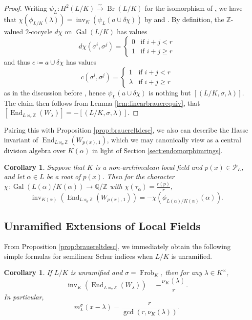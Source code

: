 \documentclass[10pt, reqno, hidelinks]{amsart}
\DeclareMathOperator{\Gal}{Gal}
\DeclareMathOperator{\Br}{Br}
\DeclareMathOperator{\End}{End}
\DeclareMathOperator{\inv}{inv}
\DeclareMathOperator{\Frob}{Frob}
\newcommand{\twopartdef}[4]
{
	\left\{
		\begin{array}{ll}
			#1 & \mbox{if } #2 \\
			#3 & \mbox{if } #4
		\end{array}
	\right.
}
\newcommand{\bQ}{{\mathbb Q}}
\newcommand{\bZ}{{\mathbb Z}}
\newcommand{\sP}{{\mathcal P}}
\numberwithin{thm}{subsection}
\newtheorem{cor}[thm]{Corollary}
\theoremstyle{definition}
\begin{document}
\begin{proof}
	Writing $\psi_L \colon H^2(L/K) \xrightarrow{\sim} \Br(L/K)$ for the isomorphism of \cite[Thm.\ IV. 3.14]{milneCFT}, we have that $\chi(\phi_{L/K}(\lambda)) = \inv_K(\psi_L(a \cup \delta \chi))$ by \cite[Prop.\ III.3.6 ]{milneCFT} and \cite[Rem.\ IV.4.4(a)]{milneCFT}. By definition, the $\bZ$-valued $2$-cocycle $d\chi$ on $\Gal(L/K)$ has values
	\[
	d\chi(\sigma^i, \sigma^j) = \twopartdef{0}{i+j < r}{1}{i+j \geq r}
	\]
	and thus $c \coloneqq a \cup \delta \chi$ has values
	\[
	c(\sigma^i, \sigma^j) = \twopartdef{1}{i+j < r}{\lambda}{i+j \geq r}
	\]
	as in the discussion before \cite[Prop.\ III.3.6 ]{milneCFT}, hence $\psi_L(a \cup \delta \chi)$ is nothing but $[(L/K, \sigma, \lambda)]$. The claim then follows from Lemma \ref{lem:linearbrauerequiv}, that $[\End_{L \rtimes_{\sigma} \bZ}(W_{\lambda})] = -[(L/K, \sigma, \lambda)]$. 
\end{proof}

Pairing this with Proposition \ref{prop:brauereltdesc}, we also can describe the Hasse invariant of $\End_{L \rtimes_{\sigma} \bZ}(W_{p(x),1})$, which we may canonically view as a central division algebra over $K(\alpha)$ in light of Section \ref{sect:endomorphimrings}.

\begin{cor}
Suppose that $K$ is a non-archimedean local field and $p(x) \in \sP_L$, and let $\alpha \in \overline{L}$ be a root of $p(x)$. Then for the character $\chi \colon \Gal(L(\alpha) / K(\alpha)) \rightarrow \bQ / \bZ$ with $\chi(\tau_{\alpha}) = \frac{r(p)}{r}$, 
\[
\inv_{K(\alpha)}(\End_{L \rtimes_{\sigma} \bZ}(W_{p(x),1})) = -\chi(\phi_{L(\alpha) / K(\alpha)}(\alpha)).
\]
\end{cor}

\subsection{Unramified Extensions of Local Fields}\label{sect:unramexts}

From Proposition \ref{prop:brauereltdesc}, we immediately obtain the following simple formulas for semilinear Schur indices when $L / K$ is unramified.

\begin{cor}\label{cor:unramSLSchur}
	If $L / K$ is unramified and $\sigma = \Frob_K$, then for any $\lambda \in K^{\times}$, 
	\[
	\inv_K(\End_{L \rtimes_{\sigma} \bZ}(W_{\lambda})) = -\frac{\nu_K(\lambda)}{r}.
	\]
	In particular,
	\[
	m_L^{\sigma}(x - \lambda) = \frac{r}{\gcd(r, \nu_K(\lambda))}.
	\]
\end{cor}
\end{document}
